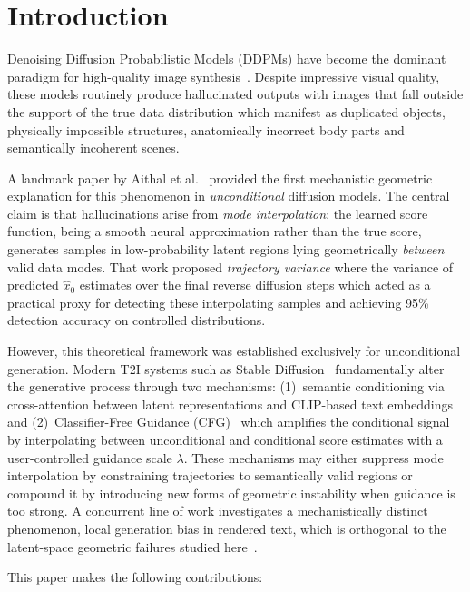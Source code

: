 \documentclass[conference]{IEEEtran}
\begin{document}
\section{Introduction}
\label{sec:introduction}

Denoising Diffusion Probabilistic Models (DDPMs) have become the
dominant paradigm for high-quality image synthesis~\cite{ho2020ddpm,
song2020ddim}. Despite impressive visual quality, these models
routinely produce hallucinated outputs with images that fall outside
the support of the true data distribution which manifest as duplicated
objects, physically impossible structures, anatomically incorrect
body parts and semantically incoherent scenes.

A landmark paper by Aithal et al.~\cite{yi2024understanding} provided
the first mechanistic geometric explanation for this phenomenon in
\emph{unconditional} diffusion models. The central claim is that
hallucinations arise from \emph{mode interpolation}: the learned
score function, being a smooth neural approximation rather than the
true score, generates samples in low-probability latent regions lying
geometrically \emph{between} valid data modes. That work proposed
\emph{trajectory variance} where the variance of predicted $\hat{x}_0$
estimates over the final reverse diffusion steps which acted as a practical
proxy for detecting these interpolating samples and achieving 95\%
detection accuracy on controlled distributions.

However, this theoretical framework was established exclusively for
unconditional generation. Modern T2I systems such as Stable
Diffusion~\cite{rombach2022ldm} fundamentally alter the generative
process through two mechanisms: (1)~semantic conditioning via
cross-attention between latent representations and CLIP-based text
embeddings~\cite{radford2021clip} and (2)~Classifier-Free
Guidance (CFG)~\cite{ho2022cfg} which amplifies the conditional
signal by interpolating between unconditional and conditional score
estimates with a user-controlled guidance scale $\lambda$. These
mechanisms may either suppress mode interpolation by constraining
trajectories to semantically valid regions or compound it by
introducing new forms of geometric instability when guidance is
too strong. A concurrent line of work investigates a mechanistically
distinct phenomenon, local generation bias in rendered text, which
is orthogonal to the latent-space geometric failures studied
here~\cite{liu2024texthallu}.

This paper makes the following contributions:
\end{document}
